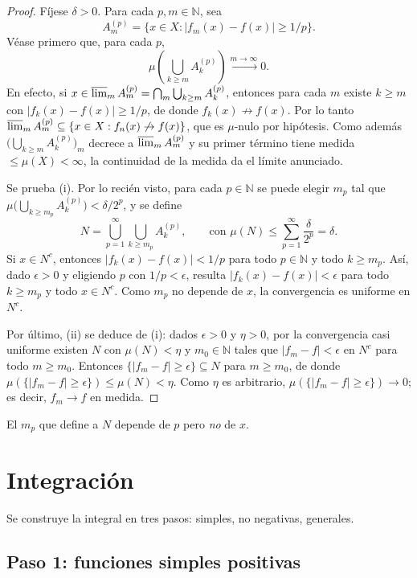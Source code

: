 \documentclass[11pt, a4paper]{article}
\begin{document}
\begin{proof}
Fíjese $\delta > 0$. Para cada $p, m \in \mathbb{N}$, sea
$$ A_m^{(p)} = \{x \in X : |f_m(x) - f(x)| \ge 1/p\}. $$
Véase primero que, para cada $p$,
$$ \mu\!\left(\bigcup_{k \ge m} A_k^{(p)}\right) \xrightarrow{m \to \infty} 0. $$
En efecto, si $x \in \varlimsup_m A_m^{(p)} = \bigcap_m \bigcup_{k \ge m} A_k^{(p)}$, entonces para
cada $m$ existe $k \ge m$ con $|f_k(x) - f(x)| \ge 1/p$, de donde $f_k(x) \not\to f(x)$. Por lo
tanto $\varlimsup_m A_m^{(p)} \subseteq \{x \in X : f_n(x) \not\to f(x)\}$, que es $\mu$-nulo por
hipótesis. Como además $\big(\bigcup_{k \ge m} A_k^{(p)}\big)_m$ decrece a
$\varlimsup_m A_m^{(p)}$ y su primer término tiene medida $\le \mu(X) < \infty$, la continuidad de
la medida da el límite anunciado.

Se prueba (i). Por lo recién visto, para cada $p \in
\mathbb{N}$ se puede elegir $m_p$ tal que $\mu\big(\bigcup_{k \ge m_p} A_k^{(p)}\big) < \delta/2^p$, y
se define
$$ N = \bigcup_{p=1}^\infty \bigcup_{k \ge m_p} A_k^{(p)}, \qquad \text{con } \mu(N) \le
\sum_{p=1}^\infty \frac{\delta}{2^p} = \delta. $$
Si $x \in N^c$, entonces $|f_k(x) - f(x)| < 1/p$ para todo $p \in \mathbb{N}$ y todo $k \ge m_p$.
Así, dado $\epsilon > 0$ y eligiendo $p$ con $1/p < \epsilon$, resulta $|f_k(x) - f(x)| < \epsilon$
para todo $k \ge m_p$ y todo $x \in N^c$. Como $m_p$ no depende de $x$, la convergencia es uniforme
en $N^c$.

Por último, (ii) se deduce de (i): dados $\epsilon > 0$ y $\eta > 0$, por la convergencia casi
uniforme existen $N$ con $\mu(N) < \eta$ y $m_0 \in \mathbb{N}$ tales que $|f_m - f| < \epsilon$ en
$N^c$ para todo $m \ge m_0$. Entonces $\{|f_m - f| \ge \epsilon\} \subseteq N$ para $m \ge m_0$, de
donde $\mu(\{|f_m - f| \ge \epsilon\}) \le \mu(N) < \eta$. Como $\eta$ es arbitrario,
$\mu(\{|f_m - f| \ge \epsilon\}) \to 0$; es decir, $f_m \to f$ en medida.
\end{proof}

\obs El $m_p$ que define a $N$ depende de $p$ pero \emph{no} de $x$.

\newpage

\section{Integración}

Se construye la integral en tres pasos: simples, no negativas, generales.

\subsection{Paso 1: funciones simples positivas}
\end{document}
